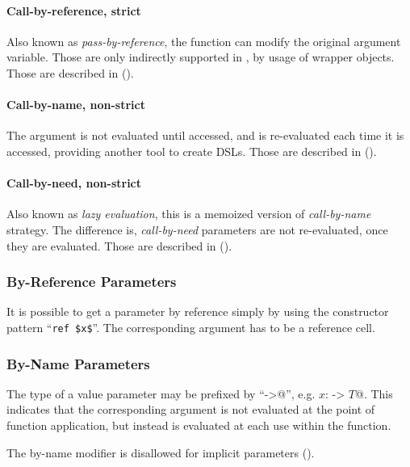 \paragraph{Call-by-reference, strict}
Also known as {\em pass-by-reference}, the function can modify the original argument variable. Those are only indirectly supported in \Aml, by usage of wrapper objects. Those are described in ().

\paragraph{Call-by-name, non-strict}
The argument is not evaluated until accessed, and is re-evaluated each time it is accessed, providing another tool to create DSLs. Those are described in (). 

\paragraph{Call-by-need, non-strict}
Also known as {\em lazy evaluation}, this is a memoized version of {\em call-by-name} strategy. The difference is, {\em call-by-need} parameters are not re-evaluated, once they are evaluated. Those are described in ().





\subsubsection{By-Reference Parameters}
\label{sec:by-ref-parameters}

It is possible to get a parameter by reference simply by using the constructor pattern ``\lstinline!ref $x$!''. The corresponding argument has to be a reference cell. 





\subsubsection{By-Name Parameters}
\label{sec:by-name-parameters}

The type of a value parameter may be prefixed by ``\lstinline@->@'', e.g. \lstinline@$x$: -> $T$@. This indicates that the corresponding argument is not evaluated at the point of function application, but instead is evaluated at each use within the function.

The by-name modifier is disallowed for implicit parameters ().

